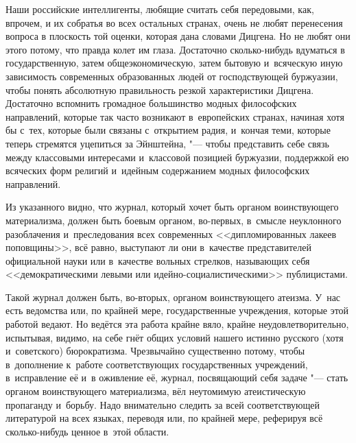 Наши российские интеллигенты, любящие считать себя передовыми, как, впрочем,
и их собратья во всех остальных странах, очень не любят перенесения вопроса
в плоскость той оценки, которая дана словами Дицгена. Но не любят они этого
потому, что правда колет им глаза. Достаточно сколько-нибудь вдуматься в
государственную, затем общеэкономическую, затем бытовую и~всяческую иную
зависимость современных образованных людей от господствующей буржуазии,
чтобы понять абсолютную правильность резкой характеристики
Дицгена. Достаточно вспомнить громадное большинство модных философских
направлений, которые так часто возникают в~европейских странах, начиная хотя
бы с~тех, которые были связаны с~открытием радия, и~кончая теми, которые
теперь стремятся уцепиться за Эйнштейна, "--- чтобы представить себе связь
между классовыми интересами и~классовой позицией буржуазии, поддержкой ею
всяческих форм религий и~идейным содержанием модных философских направлений.

Из указанного видно, что журнал, который хочет быть органом воинствующего
материализма, должен быть боевым органом, во-первых, в~смысле неуклонного
разоблачения и~преследования всех современных <<дипломированных лакеев
поповщины>>, всё равно, выступают ли они в~качестве представителей
официальной науки или в~качестве вольных стрелков, называющих себя
<<демократическими левыми или идейно-социалистическими>> публицистами.

Такой журнал должен быть, во-вторых, органом воинствующего атеизма. У~нас
есть ведомства или, по крайней мере, государственные учреждения, которые
этой работой ведают. Но ведётся эта работа крайне вяло, крайне
неудовлетворительно, испытывая, видимо, на себе гнёт общих условий нашего
истинно русского (хотя и~советского) бюрократизма. Чрезвычайно существенно
потому, чтобы в~дополнение к~работе соответствующих государственных
учреждений, в~исправление её и~в оживление её, журнал, посвящающий себя
задаче "--- стать органом воинствующего материализма, вёл неутомимую
атеистическую пропаганду и~борьбу. Надо внимательно следить за всей
соответствующей литературой на всех языках, переводя или, по крайней мере,
реферируя всё сколько-нибудь ценное в~этой области.

